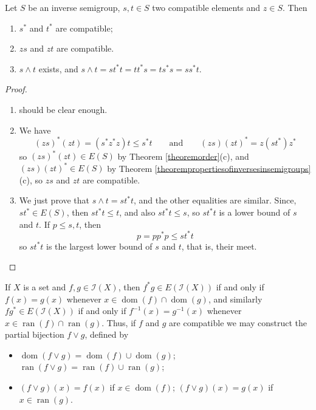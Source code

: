 \begin{proposition}\label{propositioncompatibility}
Let $S$ be an inverse semigroup, $s,t\in S$ two compatible elements and $z\in S$. Then
\begin{enumerate}
\item[(a)] $s^*$ and $t^*$ are compatible;
\item[(b)] $zs$ and $zt$ are compatible.
\item[(c)] $s\land t$ exists, and $s\land t=st^*t=tt^*s=ts^*s=ss^*t$.
\end{enumerate}
\end{proposition}
\begin{proof}
\begin{enumerate}
\item[(a)] should be clear enough.
\item[(b)] We have
\[(zs)^*(zt)=(s^*z^*z)t\leq s^*t\qquad\text{and}\qquad(zs)(zt)^*=z(st^*)z^*\]
so $(zs)^*(zt)\in E(S)$ by Theorem \ref{theoremorder}(c), and $(zs)(zt)^*\in E(S)$ by Theorem \ref{theorempropertiesofinversesinsemigroups}(c), so $zs$ and $zt$ are compatible.
\item[(c)] We just prove that $s\land t=st^*t$, and the other equalities are similar. Since, $st^*\in E(S)$, then $st^*t\leq t$, and also $st^*t\leq s$, so $st^*t$ is a lower bound of $s$ and $t$. If $p\leq s,t$, then
\[p=pp^*p\leq st^*t\]
so $st^*t$ is the largest lower bound of $s$ and $t$, that is, their meet.\qedhere
\end{enumerate}
\end{proof}

\begin{example}
If $X$ is a set and $f,g\in \mathcal{I}(X)$, then $f^*g\in E(\mathcal{I}(X))$ if and only if $f(x)=g(x)$ whenever $x\in\operatorname{dom}(f)\cap\operatorname{dom}(g)$, and similarly $fg^*\in E(\mathcal{I}(X))$ if and only if $f^{-1}(x)=g^{-1}(x)$ whenever $x\in\operatorname{ran}(f)\cap\operatorname{ran}(g)$. Thus, if $f$ and $g$ are compatible we may construct the partial bijection $f\lor g$, defined by
\begin{itemize}
\item $\operatorname{dom}(f\lor g)=\operatorname{dom}(f)\cup\operatorname{dom}(g)$; $\operatorname{ran}(f\lor g)=\operatorname{ran}(f)\cup\operatorname{ran}(g)$;
\item $(f\lor g)(x)=f(x)$ if $x\in\operatorname{dom}(f)$; $(f\lor g)(x)=g(x)$ if $x\in\operatorname{ran}(g)$.
\end{itemize}
\end{example}

